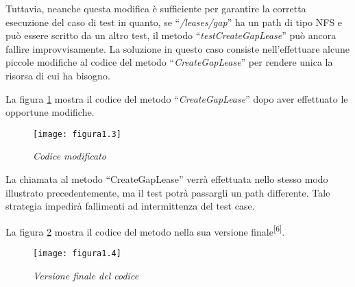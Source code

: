 Tuttavia, neanche questa modifica è sufficiente per garantire la corretta esecuzione del caso di test in quanto, se “\emph{/leases/gap}” ha un path di tipo NFS e può essere scritto da un altro test, il metodo “\emph{testCreateGapLease}” può ancora fallire improvvisamente. La soluzione in questo caso consiste nell’effettuare alcune piccole modifiche al codice del metodo “\emph{CreateGapLease}” per rendere unica la
risorsa di cui ha bisogno.

La figura \ref{fig:fig.1.3} mostra il codice del metodo “\emph{CreateGapLease}” dopo aver effettuato le opportune modifiche.
\newpage
\begin{figure}[h!]
	\centering
	\texttt{[image: figura1.3]}
	\caption{\emph{Codice modificato}}
	\label{fig:fig.1.3}
\end{figure}

La chiamata al metodo “CreateGapLease” verrà effettuata nello stesso modo illustrato precedentemente, ma il test potrà passargli un path differente. Tale strategia impedirà fallimenti ad intermittenza del test case.

La figura \ref{fig:fig.1.4} mostra il codice del metodo nella sua versione finale\textsuperscript{[6]}.
\begin{figure}[h!]
	\centering
	\texttt{[image: figura1.4]}
	\caption{\emph{Versione finale del codice}}
	\label{fig:fig.1.4}
\end{figure}